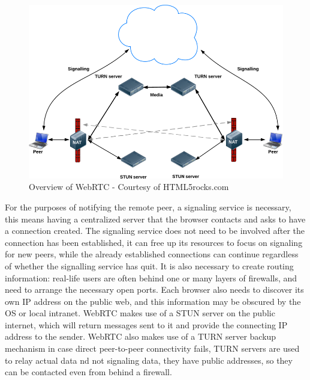\begin{figure}[H]
	\centering
	\includegraphics[scale=0.4]{gfx/webrtc-connect}
	\caption{Overview of WebRTC - Courtesy of HTML5rocks.com}
	\label{fig:webrtc-connect}
\end{figure}

For the purposes of notifying the remote peer, a signaling service is necessary,
this means having a centralized server that the browser contacts and asks to have a connection created.
The signaling service does not need to be involved after the connection has been established,
it can free up its resources to focus on signaling for new peers, 
while the already established connections can continue regardless of whether the signalling service has quit.
It is also necessary to create routing information:
real-life users are often behind one or many layers of firewalls, 
and need to arrange the necessary open ports.
Each browser also needs to discover its own IP address on the public web, 
and this information may be obscured by the OS or local intranet.
WebRTC makes use of a STUN server on the public internet, 
which will return messages sent to it and provide the connecting IP address to the sender.
WebRTC also makes use of a TURN server backup mechanism in case direct peer-to-peer connectivity fails,
TURN servers are used to relay actual data nd not signaling data, they have public addresses, 
so they can be contacted even from behind a firewall.
\newline

%
